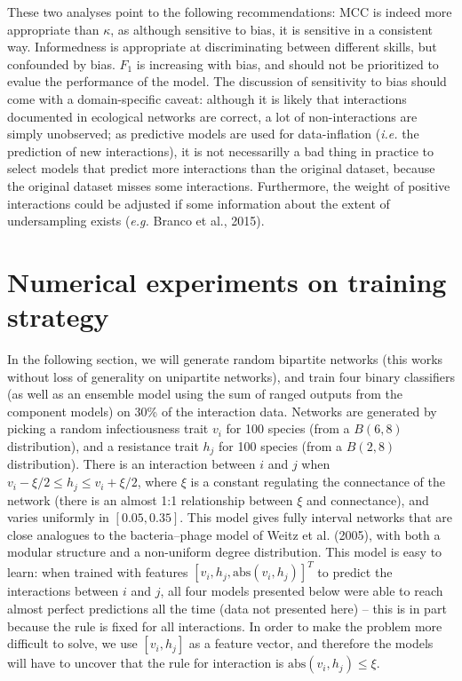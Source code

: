 \documentclass[11pt]{article}
\begin{document}
These two analyses point to the following recommendations: MCC is indeed
more appropriate than \(\kappa\), as although sensitive to bias, it is
sensitive in a consistent way. Informedness is appropriate at
discriminating between different skills, but confounded by bias. \(F_1\)
is increasing with bias, and should not be prioritized to evalue the
performance of the model. The discussion of sensitivity to bias should
come with a domain-specific caveat: although it is likely that
interactions documented in ecological networks are correct, a lot of
non-interactions are simply unobserved; as predictive models are used
for data-inflation (\emph{i.e.} the prediction of new interactions), it
is not necessarilly a bad thing in practice to select models that
predict more interactions than the original dataset, because the
original dataset misses some interactions. Furthermore, the weight of
positive interactions could be adjusted if some information about the
extent of undersampling exists (\emph{e.g.} Branco et al., 2015).

\hypertarget{numerical-experiments-on-training-strategy}{%
\section{Numerical experiments on training
strategy}\label{numerical-experiments-on-training-strategy}}

In the following section, we will generate random bipartite networks
(this works without loss of generality on unipartite networks), and
train four binary classifiers (as well as an ensemble model using the
sum of ranged outputs from the component models) on 30\% of the
interaction data. Networks are generated by picking a random
infectiousness trait \(v_i\) for 100 species (from a \(B(6,8)\)
distribution), and a resistance trait \(h_j\) for 100 species (from a
\(B(2,8)\) distribution). There is an interaction between \(i\) and
\(j\) when \(v_i-\xi/2 \le h_j \le v_i+\xi/2\), where \(\xi\) is a
constant regulating the connectance of the network (there is an almost
1:1 relationship between \(\xi\) and connectance), and varies uniformly
in \([0.05, 0.35]\). This model gives fully interval networks that are
close analogues to the bacteria--phage model of Weitz et al. (2005),
with both a modular structure and a non-uniform degree distribution.
This model is easy to learn: when trained with features
\([v_i, h_j, \text{abs}(v_i, h_j)] ^T\) to predict the interactions
between \(i\) and \(j\), all four models presented below were able to
reach almost perfect predictions all the time (data not presented here)
-- this is in part because the rule is fixed for all interactions. In
order to make the problem more difficult to solve, we use \([v_i, h_j]\)
as a feature vector, and therefore the models will have to uncover that
the rule for interaction is \(\text{abs}(v_i, h_j) \le \xi\).
\end{document}
